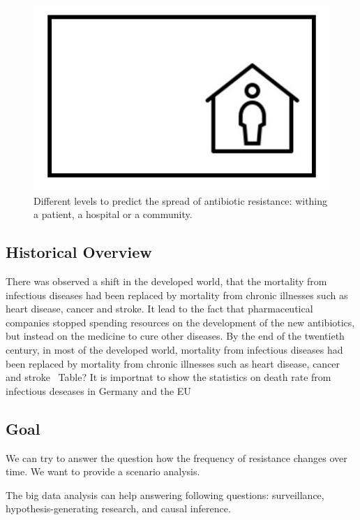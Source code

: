\documentclass[12pt]{article}
\begin{document}
\begin{figure}\includegraphics[width=\textwidth]{Images/distribution.jpg}\caption{Different levels to predict the spread of antibiotic resistance: withing a patient, a hospital or a community.}
	\end{figure}


\subsection{Historical Overview}
There was observed a shift in the developed world, that the mortality from infectious diseases had been replaced by mortality from chronic illnesses such as heart disease, cancer and stroke. It lead to the fact that pharmaceutical companies stopped spending resources on the development of the new antibiotics, but instead on the medicine to cure other diseases. By the end of the twentieth century, in most of the developed world, mortality from infectious diseases had been replaced by mortality from chronic illnesses such as heart disease, cancer and stroke~\cite{Dasbas.2016}
Table?
It is importnat to show the statistics on death rate from infectious deseases in Germany and the EU

\subsection{Goal}

We can try to answer the question how the frequency of resistance changes over time. We want to provide a scenario analysis. 

The big data analysis can help answering following questions: surveillance, hypothesis-generating research, and causal inference.~\cite{Mooney.2018}
\end{document}
